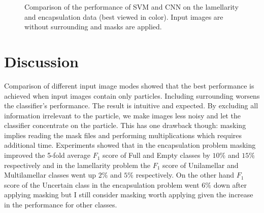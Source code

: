 \documentclass[a4paper, 11pt, table]{article}
\begin{document}
\begin{landscape}
\begin{figure}
\caption{\label{fig:svm_vs_cnn} Comparison of the performance of SVM and CNN  on the lamellarity and encapsulation data (best viewed in color). Input images are without surrounding and masks are applied.}
\end{figure}
 
\end{landscape}

\section{Discussion}

Comparison of different input image modes showed that the best performance is achieved when input images contain only particles. Including surrounding worsens the classifier's performance. The result is intuitive and expected. By excluding all information irrelevant to the particle, we make images less noisy and let the classifier concentrate on the particle. This has one drawback though: masking implies reading the mask files and performing multiplications which requires additional time. Experiments showed that in the encapsulation problem masking improved the 5-fold average $F_1$ score of Full and Empty classes by $10\%$ and $15\%$ respectively and in the lamellarity problem the $F_1$ score of Unilamellar and Multilamellar classes went up $2\%$ and $5\%$ respectively. On the other hand $F_1$ score of the Uncertain class in the encapsulation problem went $6\%$ down after applying masking but I still consider masking worth applying given the increase in the performance for other classes.
\end{document}

